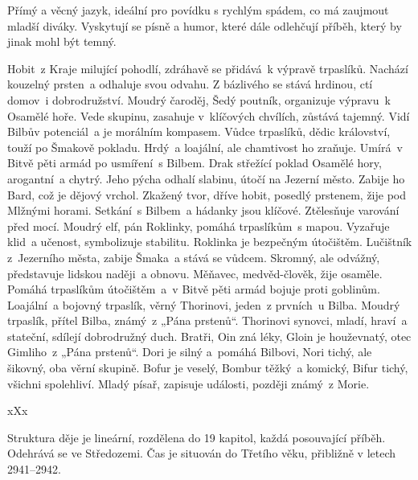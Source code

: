 \documentclass{extarticle} %
\begin{document}


\noindent Přímý a věcný jazyk, ideální pro povídku s rychlým spádem, co má zaujmout mladší diváky.
Vyskytují se písně a humor, které dále odlehčují příběh, který by jinak mohl být temný.

\noindent 
{} Hobit~z Kraje milující pohodlí,
zdráhavě se přidává~k výpravě trpaslíků.
Nachází kouzelný prsten~a odhaluje svou odvahu.
Z bázlivého se stává hrdinou, ctí domov~i dobrodružství.
 Moudrý čaroděj, Šedý poutník, organizuje výpravu~k Osamělé hoře.
Vede skupinu, zasahuje v~klíčových chvílích, zůstává tajemný.
Vidí Bilbův potenciál~a je morálním kompasem.
 Vůdce trpaslíků, dědic království, touží po Šmakově pokladu.
Hrdý~a loajální, ale chamtivost ho zraňuje.
Umírá~v Bitvě pěti armád po usmíření~s Bilbem.
 Drak střežící poklad Osamělé hory, arogantní~a chytrý.
Jeho pýcha odhalí slabinu, útočí na Jezerní město.
Zabije ho Bard, což je dějový vrchol.
 Zkažený tvor, dříve hobit, posedlý prstenem, žije pod Mlžnými horami.
Setkání~s Bilbem~a hádanky jsou klíčové.
Ztělesňuje varování před mocí.
 Moudrý elf, pán Roklinky, pomáhá trpaslíkům~s mapou.
Vyzařuje klid~a učenost, symbolizuje stabilitu.
Roklinka je bezpečným útočištěm.
 Lučištník z~Jezerního města, zabije Šmaka~a stává se vůdcem.
Skromný, ale odvážný, představuje lidskou naději~a obnovu.
 Měňavec, medvěd-člověk, žije osaměle.
Pomáhá trpaslíkům útočištěm~a~v Bitvě pěti armád bojuje proti goblinům.
 Loajální~a bojovný trpaslík, věrný Thorinovi, jeden~z prvních~u Bilba.
 Moudrý trpaslík, přítel Bilba, známý~z „Pána prstenů“.
 Thorinovi synovci, mladí, hraví~a stateční,
sdílejí dobrodružný duch.
 Bratři, Oin zná léky, Gloin je houževnatý,
otec Gimliho~z „Pána prstenů“.
 Dori je silný a~pomáhá Bilbovi, Nori tichý, ale šikovný,
oba věrní skupině.
 Bofur je veselý, Bombur těžký~a komický,
Bifur tichý, všichni spolehliví.
 Mladý písař, zapisuje události, později známý~z Morie.

\noindent 
xXx

\noindent Struktura děje je lineární, rozdělena do 19 kapitol, každá posouvající příběh.
Odehrává se ve Středozemi.
Čas je situován do Třetího věku, přibližně v letech 2941–2942.
\end{document}
